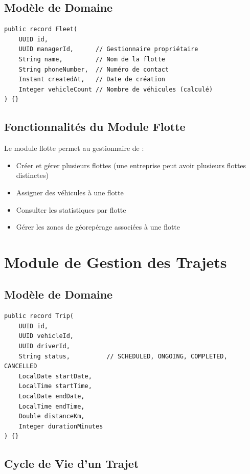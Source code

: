 \documentclass[12pt,a4paper]{report}
\begin{document}
\subsection{Modèle de Domaine}

\begin{lstlisting}[style=javaStyle, caption={Modèle de domaine Fleet}]
public record Fleet(
    UUID id,
    UUID managerId,      // Gestionnaire propriétaire
    String name,         // Nom de la flotte
    String phoneNumber,  // Numéro de contact
    Instant createdAt,   // Date de création
    Integer vehicleCount // Nombre de véhicules (calculé)
) {}
\end{lstlisting}

\subsection{Fonctionnalités du Module Flotte}

Le module flotte permet au gestionnaire de :
\begin{itemize}[leftmargin=2cm]
  \item Créer et gérer plusieurs flottes (une entreprise peut avoir plusieurs flottes distinctes)
  \item Assigner des véhicules à une flotte
  \item Consulter les statistiques par flotte
  \item Gérer les zones de géorepérage associées à une flotte
\end{itemize}

\section{Module de Gestion des Trajets}

\subsection{Modèle de Domaine}

\begin{lstlisting}[style=javaStyle, caption={Modèle de domaine Trip}]
public record Trip(
    UUID id,
    UUID vehicleId,
    UUID driverId,
    String status,          // SCHEDULED, ONGOING, COMPLETED, CANCELLED
    LocalDate startDate,
    LocalTime startTime,
    LocalDate endDate,
    LocalTime endTime,
    Double distanceKm,
    Integer durationMinutes
) {}
\end{lstlisting}

\subsection{Cycle de Vie d'un Trajet}
\end{document}
